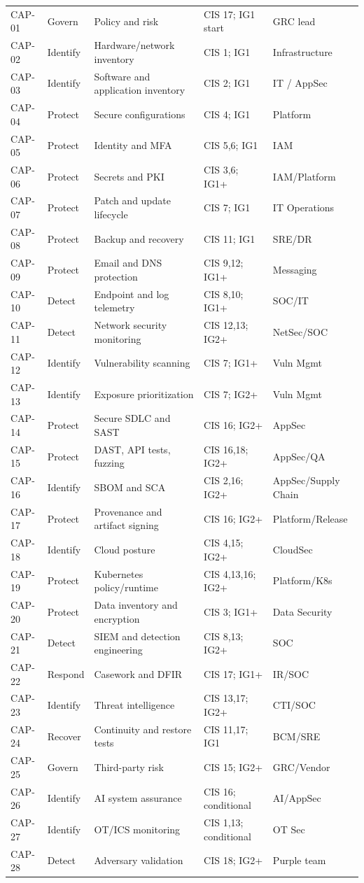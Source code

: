 \documentclass[11pt,oneside]{report}
\begin{document}
\begin{longtable}{P{0.095\textwidth}P{0.125\textwidth}P{0.25\textwidth}P{0.21\textwidth}P{0.18\textwidth}}
CAP-01 & Govern & Policy and risk & CIS 17; IG1 start & GRC lead \\
CAP-02 & Identify & Hardware/network inventory & CIS 1; IG1 & Infrastructure \\
CAP-03 & Identify & Software and application inventory & CIS 2; IG1 & IT / AppSec \\
CAP-04 & Protect & Secure configurations & CIS 4; IG1 & Platform \\
CAP-05 & Protect & Identity and MFA & CIS 5,6; IG1 & IAM \\
CAP-06 & Protect & Secrets and PKI & CIS 3,6; IG1+ & IAM/Platform \\
CAP-07 & Protect & Patch and update lifecycle & CIS 7; IG1 & IT Operations \\
CAP-08 & Protect & Backup and recovery & CIS 11; IG1 & SRE/DR \\
CAP-09 & Protect & Email and DNS protection & CIS 9,12; IG1+ & Messaging \\
CAP-10 & Detect & Endpoint and log telemetry & CIS 8,10; IG1+ & SOC/IT \\
CAP-11 & Detect & Network security monitoring & CIS 12,13; IG2+ & NetSec/SOC \\
CAP-12 & Identify & Vulnerability scanning & CIS 7; IG1+ & Vuln Mgmt \\
CAP-13 & Identify & Exposure prioritization & CIS 7; IG2+ & Vuln Mgmt \\
CAP-14 & Protect & Secure SDLC and SAST & CIS 16; IG2+ & AppSec \\
CAP-15 & Protect & DAST, API tests, fuzzing & CIS 16,18; IG2+ & AppSec/QA \\
CAP-16 & Identify & SBOM and SCA & CIS 2,16; IG2+ & AppSec/Supply Chain \\
CAP-17 & Protect & Provenance and artifact signing & CIS 16; IG2+ & Platform/Release \\
CAP-18 & Identify & Cloud posture & CIS 4,15; IG2+ & CloudSec \\
CAP-19 & Protect & Kubernetes policy/runtime & CIS 4,13,16; IG2+ & Platform/K8s \\
CAP-20 & Protect & Data inventory and encryption & CIS 3; IG1+ & Data Security \\
CAP-21 & Detect & SIEM and detection engineering & CIS 8,13; IG2+ & SOC \\
CAP-22 & Respond & Casework and DFIR & CIS 17; IG1+ & IR/SOC \\
CAP-23 & Identify & Threat intelligence & CIS 13,17; IG2+ & CTI/SOC \\
CAP-24 & Recover & Continuity and restore tests & CIS 11,17; IG1 & BCM/SRE \\
CAP-25 & Govern & Third-party risk & CIS 15; IG2+ & GRC/Vendor \\
CAP-26 & Identify & AI system assurance & CIS 16; conditional & AI/AppSec \\
CAP-27 & Identify & OT/ICS monitoring & CIS 1,13; conditional & OT Sec \\
CAP-28 & Detect & Adversary validation & CIS 18; IG2+ & Purple team \\
\bottomrule\end{longtable}\normalsize
\end{document}
